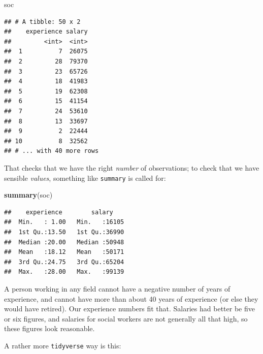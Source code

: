 \documentclass[]{tufte-book}
\newenvironment{Shaded}{}{}
\newcommand{\KeywordTok}[1]{\textcolor[rgb]{0.00,0.44,0.13}{\textbf{#1}}}
\newcommand{\NormalTok}[1]{#1}
\newcommand{\OperatorTok}[1]{\textcolor[rgb]{0.40,0.40,0.40}{#1}}
\newcommand{\StringTok}[1]{\textcolor[rgb]{0.25,0.44,0.63}{#1}}
\theoremstyle{definition}
\theoremstyle{definition}
\theoremstyle{definition}
\theoremstyle{remark}
\begin{document}
\begin{Shaded}
\begin{Highlighting}[]
\NormalTok{soc}
\end{Highlighting}
\end{Shaded}

\begin{verbatim}
## # A tibble: 50 x 2
##    experience salary
##         <int>  <int>
##  1          7  26075
##  2         28  79370
##  3         23  65726
##  4         18  41983
##  5         19  62308
##  6         15  41154
##  7         24  53610
##  8         13  33697
##  9          2  22444
## 10          8  32562
## # ... with 40 more rows
\end{verbatim}

That checks that we have the right \emph{number} of observations; to
check that we have sensible \emph{values}, something like
\texttt{summary} is called for:

\begin{Shaded}
\begin{Highlighting}[]
\KeywordTok{summary}\NormalTok{(soc)}
\end{Highlighting}
\end{Shaded}

\begin{verbatim}
##    experience        salary     
##  Min.   : 1.00   Min.   :16105  
##  1st Qu.:13.50   1st Qu.:36990  
##  Median :20.00   Median :50948  
##  Mean   :18.12   Mean   :50171  
##  3rd Qu.:24.75   3rd Qu.:65204  
##  Max.   :28.00   Max.   :99139
\end{verbatim}

A person working in any field cannot have a negative number of years of
experience, and cannot have more than about 40 years of experience (or
else they would have retired). Our experience numbers fit that. Salaries
had better be five or six figures, and salaries for social workers are
not generally all that high, so these figures look reasonable.

A rather more \texttt{tidyverse} way is this:

\begin{Shaded}
\end{Shaded}
\end{document}
